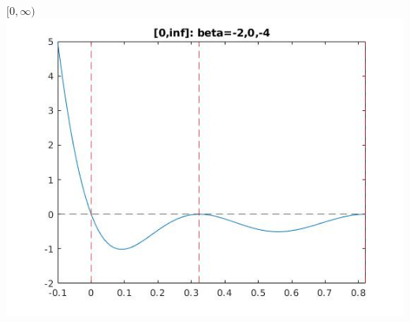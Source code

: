\documentclass[11pt]{beamer}
\begin{document}
\begin{frame}{$[0, \infty)$}
\includegraphics[scale=0.2]{quadplots/positive_4.jpg}
\end{frame}
\end{document}
